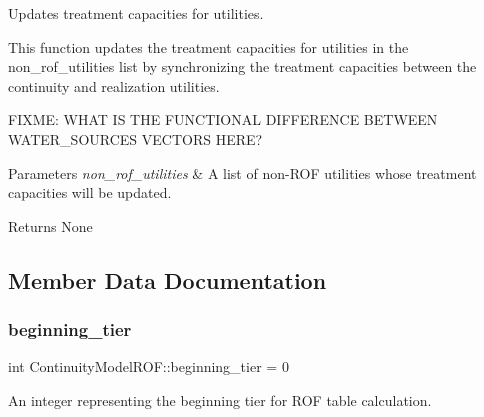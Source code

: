 Updates treatment capacities for utilities. 

This function updates the treatment capacities for utilities in the {\ttfamily non\+\_\+rof\+\_\+utilities} list by synchronizing the treatment capacities between the continuity and realization utilities.

F\+I\+X\+ME\+: W\+H\+AT IS T\+HE F\+U\+N\+C\+T\+I\+O\+N\+AL D\+I\+F\+F\+E\+R\+E\+N\+CE B\+E\+T\+W\+E\+EN W\+A\+T\+E\+R\+\_\+\+S\+O\+U\+R\+C\+ES V\+E\+C\+T\+O\+RS H\+E\+RE?


\begin{DoxyParams}{Parameters}
{\em non\+\_\+rof\+\_\+utilities} & A list of non-\/\+R\+OF utilities whose treatment capacities will be updated.\\
\hline
\end{DoxyParams}
\begin{DoxyReturn}{Returns}
None 
\end{DoxyReturn}


\subsection{Member Data Documentation}
\mbox{\label{classContinuityModelROF_ad0a8c47eca4ca66b58a2636ab907a4f2}} 
\subsubsection{\texorpdfstring{beginning\+\_\+tier}{beginning\_tier}}
{\footnotesize\ttfamily int Continuity\+Model\+R\+O\+F\+::beginning\+\_\+tier = 0\hspace{0.3cm}{\ttfamily [protected]}}



An integer representing the beginning tier for R\+OF table calculation. 

\mbox{\label{classContinuityModelROF_adcaf978b52ba016474952a42856ba373}} 
